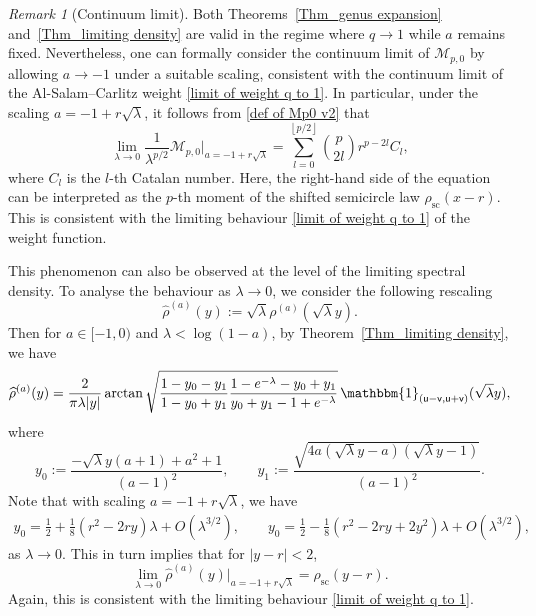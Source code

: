 \documentclass{amsart}
\newcommand{\floor}[1]{\left\lfloor#1\right\rfloor}
\theoremstyle{plain}
\theoremstyle{remark}
\newtheorem{rem}{Remark}
\newcommand{\abs}[1]{\lvert#1\rvert}
\numberwithin{equation}{section}
\begin{document}
 
\begin{rem}[Continuum limit]
    Both Theorems~\ref{Thm_genus expansion} and~\ref{Thm_limiting density} are valid in the regime where $q \to 1$ while $a$ remains fixed. Nevertheless, one can formally consider the continuum limit of $\mathcal{M}_{p,0}$ by allowing $a \to -1$ under a suitable scaling, consistent with the continuum limit of the Al-Salam--Carlitz weight \eqref{limit of weight q to 1}. In particular, under the scaling $a = -1 + r\sqrt{\lambda}$, it follows from \eqref{def of Mp0 v2} that
    \begin{equation}
     \lim_{ \lambda \to 0 }   \frac{1}{\lambda^{p/2}}\mathcal{M}_{p,0} \Big|_{ a = -1 + r\sqrt{\lambda} }
        =\sum_{l=0}^{\floor{p/2}}\binom{p}{2l}r^{p-2l} C_{l}, 
    \end{equation}
    where $C_l$ is the $l$-th Catalan number. Here, the right-hand side of the equation can be interpreted as the $p$-th moment of the shifted semicircle law $\rho_{\mathrm{sc}}(x - r)$. This is consistent with the limiting behaviour \eqref{limit of weight q to 1} of the weight function.

    This phenomenon can also be observed at the level of the limiting spectral density. 
To analyse the behaviour as $\lambda \to 0$, we consider the following rescaling
    \begin{equation}
    \widehat{\rho}^{(a)}(y):= \sqrt{\lambda} \rho^{(a)}( \sqrt{\lambda} y ). 
    \end{equation}
    Then for $a \in [-1,0)$ and $\lambda < \log(1-a)$, by Theorem~\ref{Thm_limiting density}, we have 
    \begin{align}
   \widehat{\rho}^{(a)}(y) = \frac{2}{\pi\lambda\abs{y}}\arctan{\sqrt{\frac{1-y_0-y_1}{1-y_0+y_1}\frac{1-e^{-\lambda}-y_0+y_1}{y_0+y_1-1+e^{-\lambda}}}} \, \mathbbm{1}_{(\mathsf{u}-\mathsf{v},\mathsf{u}+\mathsf{v} ) }( \sqrt{\lambda} y ), 
\end{align}
    where
    \begin{equation} \label{def of y0 y1}
        y_{0}:=\frac{-\sqrt{\lambda}y(a+1)+a^{2}+1}{(a-1)^{2}},\qquad y_{1}:=\frac{\sqrt{4a(\sqrt{\lambda}y-a)(\sqrt{\lambda}y-1)}}{(a-1)^{2}} .
    \end{equation}
    Note that with scaling $a=-1+r \sqrt{\lambda}$, we have 
    \begin{align*}
    y_0= \frac12+\frac1{8} ( r^2-2r y ) \lambda +O( \lambda^{3/2}), \qquad  y_0= \frac12-\frac1{8} ( r^2-2r y +2y^2 ) \lambda +O( \lambda^{3/2}),
    \end{align*}
    as $\lambda \to 0$. This in turn implies that for $|y-r|<2$, 
    \begin{equation}
  \lim_{ \lambda \to 0 }  \widehat{\rho}^{(a)}(y) \Big|_{ a = -1 + r\sqrt{\lambda} }
  = \rho_{\mathrm{sc}}(y - r).  
    \end{equation}
    Again, this is consistent with the limiting behaviour \eqref{limit of weight q to 1}. 
\end{rem}
\end{document}
